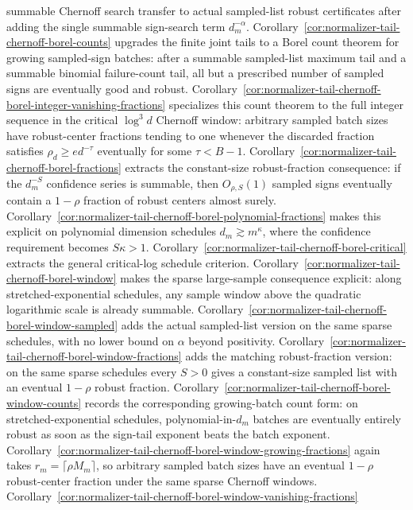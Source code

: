 \documentclass[11pt]{amsart}
\numberwithin{equation}{section}
\theoremstyle{definition}
\theoremstyle{remark}
\begin{document}
summable Chernoff search transfer to actual sampled-list robust certificates
after adding the single summable sign-search term \(d_m^{-\alpha}\).
Corollary~\ref{cor:normalizer-tail-chernoff-borel-counts} upgrades the finite
joint tails to a Borel count theorem for growing sampled-sign batches: after a
summable sampled-list maximum tail and a summable binomial failure-count tail,
all but a prescribed number of sampled signs are eventually good and robust.
Corollary~\ref{cor:normalizer-tail-chernoff-borel-integer-vanishing-fractions}
specializes this count theorem to the full integer sequence in the critical
\(\log^3 d\) Chernoff window: arbitrary sampled batch sizes have robust-center
fractions tending to one whenever the discarded fraction satisfies
\(\rho_d\ge e d^{-\tau}\) eventually for some \(\tau<B-1\).
Corollary~\ref{cor:normalizer-tail-chernoff-borel-fractions} extracts the
constant-size robust-fraction consequence: if the \(d_m^{-S}\) confidence
series is summable, then \(O_{\rho,S}(1)\) sampled signs eventually contain a
\(1-\rho\) fraction of robust centers almost surely.
Corollary~\ref{cor:normalizer-tail-chernoff-borel-polynomial-fractions} makes
this explicit on polynomial dimension schedules \(d_m\gtrsim m^\kappa\), where
the confidence requirement becomes \(S\kappa>1\).
Corollary~\ref{cor:normalizer-tail-chernoff-borel-critical} extracts the
general critical-log schedule criterion.
Corollary~\ref{cor:normalizer-tail-chernoff-borel-window} makes the sparse
large-sample consequence explicit: along stretched-exponential schedules, any
sample window above the quadratic logarithmic scale is already summable.
Corollary~\ref{cor:normalizer-tail-chernoff-borel-window-sampled} adds the
actual sampled-list version on the same sparse schedules, with no lower bound on
\(\alpha\) beyond positivity.
Corollary~\ref{cor:normalizer-tail-chernoff-borel-window-fractions} adds the
matching robust-fraction version: on the same sparse schedules every \(S>0\)
gives a constant-size sampled list with an eventual \(1-\rho\) robust fraction.
Corollary~\ref{cor:normalizer-tail-chernoff-borel-window-counts} records the
corresponding growing-batch count form: on stretched-exponential schedules,
polynomial-in-\(d_m\) batches are eventually entirely robust as soon as the
sign-tail exponent beats the batch exponent.
Corollary~\ref{cor:normalizer-tail-chernoff-borel-window-growing-fractions}
again takes \(r_m=\lceil\rho M_m\rceil\), so arbitrary sampled batch sizes have
an eventual \(1-\rho\) robust-center fraction under the same sparse Chernoff
windows.
Corollary~\ref{cor:normalizer-tail-chernoff-borel-window-vanishing-fractions}
\end{document}
